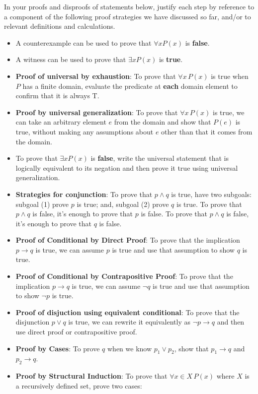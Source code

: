 In your proofs and disproofs of statements below, justify each  step
by reference to  a component of the  following proof  strategies
we  have discussed so far, and/or to relevant definitions and calculations.
\begin{itemize}
    \item A counterexample can be used to prove that  $\forall x P(x)$ is {\bf false}.
    \item  A witness can be used to prove that  $\exists x P(x)$ is {\bf true}.
    \item {\bf Proof of universal by exhaustion}: To prove that $\forall x \, P(x)$
is true when $P$ has a finite domain, evaluate the predicate at {\bf each} domain element to confirm that it is always T.
    \item  {\bf Proof by universal generalization}: To prove that $\forall x \, P(x)$
is true, we can take an arbitrary element $e$ from the domain and show that $P(e)$ is true, without making any assumptions 
about $e$ other than that it comes from the domain.
    \item To  prove  that $\exists x P(x)$ is {\bf false}, write the universal statement that is 
    logically equivalent to its negation and then prove it true using universal generalization.
    \item {\bf Strategies for conjunction}: To prove that $p \land q$ is true, have two subgoals: 
    subgoal (1) prove $p$ 
is  true; and, subgoal (2) prove $q$ is true. To prove that $p \land q$ is false, it's enough to prove that $p$ is false.
 To prove that $p \land q$ is false, it's enough to prove that $q$ is false.
    \item {\bf Proof of Conditional by Direct Proof}: To prove that the implication $p \to q$ is true, 
    we can assume $p$ is true and use that assumption to show $q$ is true.
    \item {\bf Proof of Conditional by Contrapositive Proof}: To prove that the implication $p \to q$ is true, 
    we can assume $\neg q$ is true and use that assumption to show $\neg p$ is true.
    \item {\bf Proof of disjuction using equivalent conditional}: To prove that the 
    disjunction $p \lor q$ is true, we can rewrite it equivalently as $\lnot p \to q$ and
    then use direct proof or contrapositive proof.
    \item {\bf Proof by Cases}: To prove $q$ when we know $p_1 \lor p_2$, show that $p_1 \to q$ and $p_2 \to q$.
    \item
    {\bf Proof by Structural Induction}: To prove that $\forall x \in X \, P(x)$ where $X$ is a recursively defined set, prove two cases:
        

\end{itemize}
